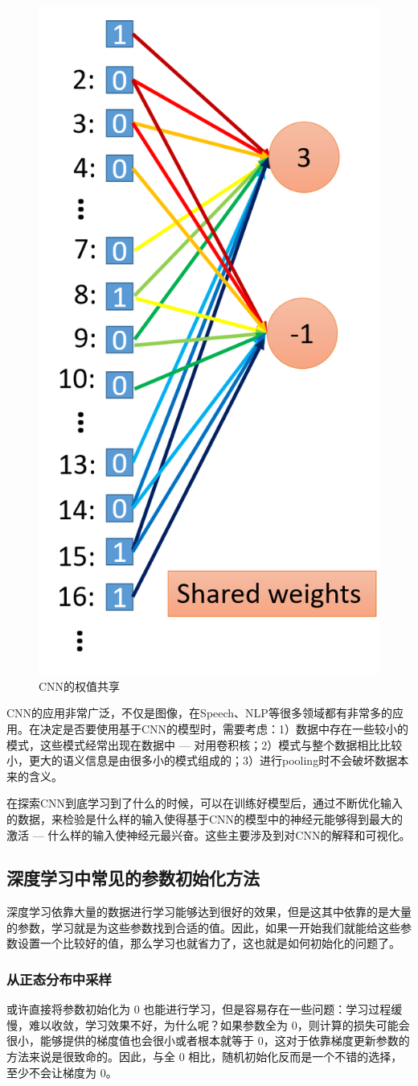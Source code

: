 \begin{figure}[h]
	\centering
	\includegraphics[width=.3\textwidth]{pics/share_weight.png}
	\caption{CNN的权值共享}
	\label{fig:share_weight}
\end{figure}

CNN的应用非常广泛，不仅是图像，在Speech、NLP等很多领域都有非常多的应用。在决定是否要使用基于CNN的模型时，需要考虑：1）数据中存在一些较小的模式，这些模式经常出现在数据中 --- 对用卷积核；2）模式与整个数据相比比较小，更大的语义信息是由很多小的模式组成的；3）进行pooling时不会破坏数据本来的含义。

在探索CNN到底学习到了什么的时候，可以在训练好模型后，通过不断优化输入的数据，来检验是什么样的输入使得基于CNN的模型中的神经元能够得到最大的激活 --- 什么样的输入使神经元最兴奋。这些主要涉及到对CNN的解释和可视化。

\subsection{深度学习中常见的参数初始化方法}
深度学习依靠大量的数据进行学习能够达到很好的效果，但是这其中依靠的是大量的参数，学习就是为这些参数找到合适的值。因此，如果一开始我们就能给这些参数设置一个比较好的值，那么学习也就省力了，这也就是如何初始化的问题了。

\subsubsection{从正态分布中采样}
或许直接将参数初始化为 0 也能进行学习，但是容易存在一些问题：学习过程缓慢，难以收敛，学习效果不好，为什么呢？如果参数全为 0，则计算的损失可能会很小，能够提供的梯度值也会很小或者根本就等于 0，这对于依靠梯度更新参数的方法来说是很致命的。因此，与全 0 相比，随机初始化反而是一个不错的选择，至少不会让梯度为 0。


